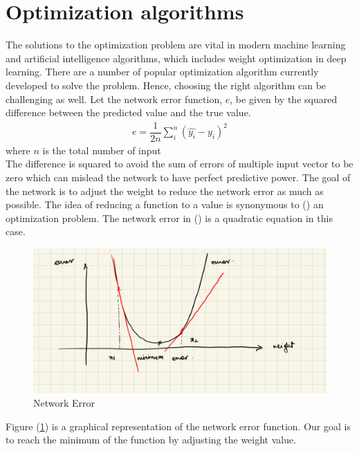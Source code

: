 \section{Optimization algorithms}
The solutions to the optimization problem are vital in modern machine learning and artificial intelligence algorithms, which includes weight optimization in deep learning. There are a number of popular optimization algorithm currently developed to solve the problem. Hence, choosing the right algorithm can be challenging as well.
Let the network error function, $e$, be given by the squared difference between the predicted value and the true value. 
\begin{align}
   e = \dfrac{1}{2n}\sum^{n}_i (\widehat{y_i}-y_i)^2
  \label{network_error}
\end{align}
where $n$ is the total number of input\\
\indent The difference is squared to avoid the sum of errors of multiple input vector to be zero which can mislead the network to have perfect predictive power. The goal of the network is to adjust the weight to reduce the network error as much as possible. The idea of reducing a function to a value is synonymous to () an optimization problem. The network error in () is a quadratic equation in this case.
\begin{figure}[H]
  \centering
  \includegraphics[scale=0.15]{CHAPTER_2/c2_fig_network_error.jpeg}
  \caption{Network Error}
  \label{network_error_graph}
\end{figure}
\noindent Figure (\ref*{network_error_graph}) is a graphical representation of the network error function. Our goal is to reach the minimum of the function by adjusting the weight value.
